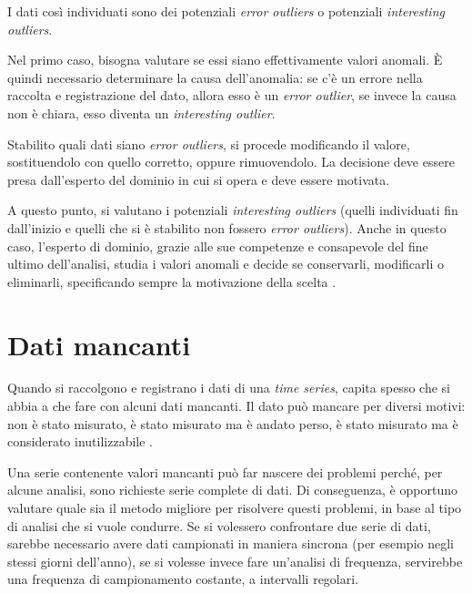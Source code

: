 I dati così individuati sono dei potenziali \textit{error outliers} o potenziali \textit{interesting outliers}. 

Nel primo caso, bisogna valutare se essi siano effettivamente valori anomali. \`E quindi necessario determinare la causa dell'anomalia: se c'è un errore nella raccolta e registrazione del dato, allora esso è un \textit{error outlier}, se invece la causa non è chiara, esso diventa un \textit{interesting outlier}.

Stabilito quali dati siano \textit{error outliers}, si procede modificando il valore, sostituendolo con quello corretto, oppure rimuovendolo. La decisione deve essere presa dall'esperto del dominio in cui si opera e deve essere motivata.

A questo punto, si valutano i potenziali \textit{interesting outliers} (quelli individuati fin dall'inizio e quelli che si è stabilito non fossero \textit{error outliers}). Anche in questo caso, l'esperto di dominio, grazie alle sue competenze e consapevole del fine ultimo dell'analisi, studia i valori anomali e decide se conservarli, modificarli o eliminarli, specificando sempre la motivazione della scelta \cite{outliers}.

\section{Dati mancanti}
\label{sec:NA}
Quando si raccolgono e registrano i dati di una \textit{time series}, capita spesso che si abbia a che fare con alcuni dati mancanti. Il dato può mancare per diversi motivi: non è stato misurato, è stato misurato ma è andato perso, è stato misurato ma è considerato inutilizzabile \cite{Moritz2015ComparisonOD}. 

Una serie contenente valori mancanti può far nascere dei problemi perché, per alcune analisi, sono richieste serie complete di dati. Di conseguenza, è opportuno valutare quale sia il metodo migliore per risolvere questi problemi, in base al tipo di analisi che si vuole condurre. Se si volessero confrontare due serie di dati, sarebbe necessario avere dati campionati in maniera sincrona (per esempio negli stessi giorni dell'anno), se si volesse invece fare un'analisi di frequenza, servirebbe una frequenza di campionamento costante, a intervalli regolari.

